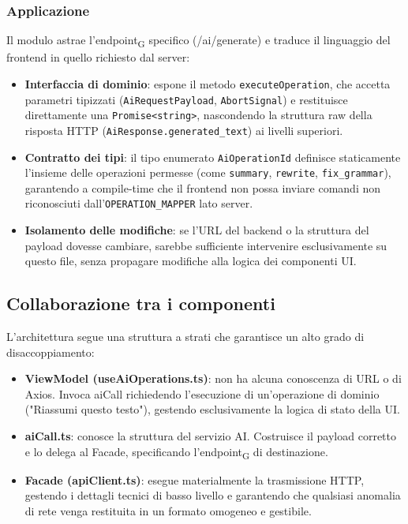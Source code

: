 \documentclass[11pt,a4paper]{article}
\newcommand{\gls}[1]{#1\textsubscript{G}}
\begin{document}
\subsubsection{Applicazione}
Il modulo astrae l'\gls{endpoint} specifico (/ai/generate) e traduce il linguaggio del frontend in quello richiesto dal server:
\begin{itemize}
\item \textbf{Interfaccia di dominio}: espone il metodo \texttt{executeOperation}, che accetta parametri tipizzati (\texttt{AiRequestPayload}, \texttt{AbortSignal}) e restituisce direttamente una \texttt{Promise<string>}, nascondendo la struttura raw della risposta HTTP (\texttt{AiResponse.generated\_text}) ai livelli superiori.
\item \textbf{Contratto dei tipi}: il tipo enumerato \texttt{AiOperationId} definisce staticamente l'insieme delle operazioni permesse (come \texttt{summary}, \texttt{rewrite}, \texttt{fix\_grammar}), garantendo a compile-time che il frontend non possa inviare comandi non riconosciuti dall'\texttt{OPERATION\_MAPPER} lato server.
\item \textbf{Isolamento delle modifiche}: se l'URL del backend o la struttura del payload dovesse cambiare, sarebbe sufficiente intervenire esclusivamente su questo file, senza propagare modifiche alla logica dei componenti UI.
\end{itemize}

\subsection{Collaborazione tra i componenti}
L'architettura segue una struttura a strati che garantisce un alto grado di disaccoppiamento:
\begin{itemize}
\item \textbf{ViewModel (useAiOperations.ts)}: non ha alcuna conoscenza di URL o di Axios. Invoca aiCall richiedendo l'esecuzione di un'operazione di dominio ("Riassumi questo testo"), gestendo esclusivamente la logica di stato della UI.
\item \textbf{aiCall.ts}: conosce la struttura del servizio AI. Costruisce il payload corretto e lo delega al Facade, specificando l'\gls{endpoint} di destinazione.
\item \textbf{Facade (apiClient.ts)}: esegue materialmente la trasmissione HTTP, gestendo i dettagli tecnici di basso livello e garantendo che qualsiasi anomalia di rete venga restituita in un formato omogeneo e gestibile.
\end{itemize}
\end{document}
